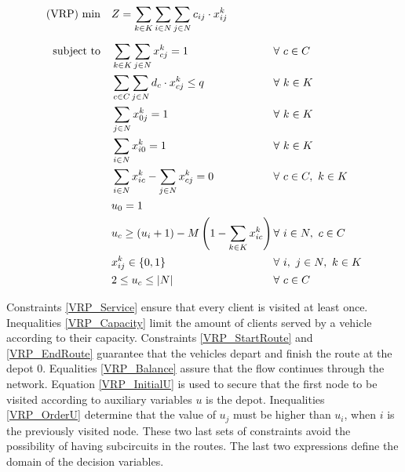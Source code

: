 \documentclass[preprint,review,12pt]{elsarticle}
\begin{document}
\begin{align}
	\text{(VRP) min} \quad      & Z = \sum\limits_{k\in K}\sum\limits_{i\in N}\sum\limits_{j\in N} c_{ij} \cdot x_{ij}^k    && \label{VRP_FObj}    \\[5pt]
	\noindent \text{subject to} \quad & \sum\limits_{k \in K}\sum\limits_{j \in N} x_{cj}^k = 1                    && \text{\hspace{-1cm}} \forall \ c \in C \label{VRP_Service} \\
	& \sum\limits_{c \in C}\sum\limits_{j \in N}d_c \cdot x_{cj}^k \leq q                 && \text{\hspace{-1cm}} \forall \ k \in K  \label{VRP_Capacity} \\
	& \sum\limits_{j \in N}x_{0j}^k = 1                                             && \text{\hspace{-1cm}} \forall \ k \in K \label{VRP_StartRoute} \\
	& \sum\limits_{i \in N}x_{i0}^k = 1                                             && \text{\hspace{-1cm}} \forall \ k \in K \label{VRP_EndRoute} \\
	& \sum\limits_{i \in N}x_{ic}^k - \sum\limits_{j \in N}x_{cj}^k = 0             && \text{\hspace{-1cm}} \forall \ c \in C,\ k \in K \label{VRP_Balance} \\
	& u_0 = 1                                                                       && \label{VRP_InitialU}\\
	& u_c \geq (u_i + 1) - M \left(1 - \sum\limits_{k \in K}x_{ic}^k \right) \qquad && \text{\hspace{-1cm}} \forall \ i \in N,\ c \in C \label{VRP_OrderU}\\
	& x_{ij}^{k} \in\{0,1\}                                                         && \text{\hspace{-1cm}} \forall \ i, \ j \in N,\ k \in K \label{VRP_DomainX}\\
	& 2 \leq u_c \leq |N|                                                           && \text{\hspace{-1cm}} \forall \ c \in C \label{VRP_DomainU}
\end{align}

Constraints \eqref{VRP_Service} ensure that every client is visited at least once. Inequalities \eqref{VRP_Capacity} limit the amount of clients served by a vehicle according to their capacity. Constraints \eqref{VRP_StartRoute} and \eqref{VRP_EndRoute} guarantee that the vehicles depart and finish the route at the depot 0. Equalities \eqref{VRP_Balance} assure that the flow continues through the network. Equation \eqref{VRP_InitialU} is used to secure that the first node to be visited according to auxiliary variables $u$ is the depot. Inequalities \eqref{VRP_OrderU} determine that the value of $u_j$ must be higher than $u_i$, when $i$ is the previously visited node. These two last sets of constraints avoid the possibility of having subcircuits in the routes. The last two expressions define the domain of the decision variables.
\end{document}
